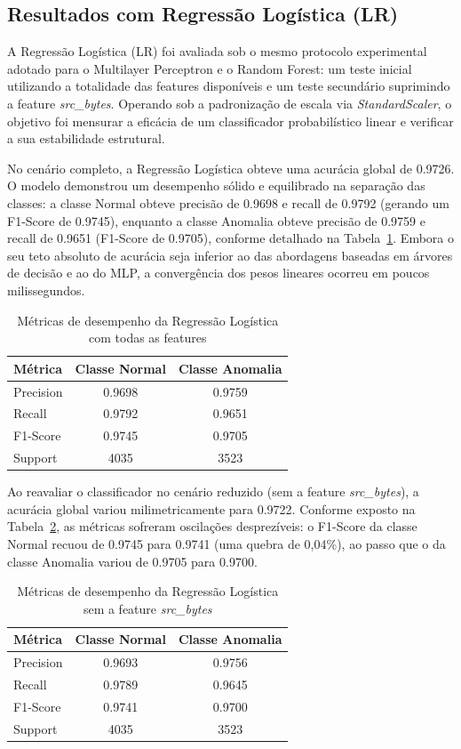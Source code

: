 \subsection{Resultados com Regressão Logística (LR)}

A Regressão Logística (LR) foi avaliada sob o mesmo protocolo experimental adotado para o Multilayer Perceptron e o Random Forest: um teste inicial utilizando a totalidade das features disponíveis e um teste secundário suprimindo a feature \textit{src\_bytes}. Operando sob a padronização de escala via \textit{StandardScaler}, o objetivo foi mensurar a eficácia de um classificador probabilístico linear e verificar a sua estabilidade estrutural.

No cenário completo, a Regressão Logística obteve uma acurácia global de 0.9726. O modelo demonstrou um desempenho sólido e equilibrado na separação das classes: a classe Normal obteve precisão de 0.9698 e recall de 0.9792 (gerando um F1-Score de 0.9745), enquanto a classe Anomalia obteve precisão de 0.9759 e recall de 0.9651 (F1-Score de 0.9705), conforme detalhado na Tabela~\ref{tab:lr_full}. Embora o seu teto absoluto de acurácia seja inferior ao das abordagens baseadas em árvores de decisão e ao do MLP, a convergência dos pesos lineares ocorreu em poucos milissegundos.

\begin{table}[ht]
\centering
\caption{Métricas de desempenho da Regressão Logística com todas as features}
\label{tab:lr_full}
\begin{tabular}{lcc}
\hline
\textbf{Métrica} & \textbf{Classe Normal} & \textbf{Classe Anomalia} \\
\hline
Precision & 0.9698 & 0.9759 \\
Recall    & 0.9792 & 0.9651 \\
F1-Score  & 0.9745 & 0.9705 \\
Support   & 4035   & 3523   \\
\hline
\end{tabular}
\end{table}

Ao reavaliar o classificador no cenário reduzido (sem a feature \textit{src\_bytes}), a acurácia global variou milimetricamente para 0.9722. Conforme exposto na Tabela~\ref{tab:lr_reduced}, as métricas sofreram oscilações desprezíveis: o F1-Score da classe Normal recuou de 0.9745 para 0.9741 (uma quebra de 0,04\%), ao passo que o da classe Anomalia variou de 0.9705 para 0.9700.

\begin{table}[ht]
\centering
\caption{Métricas de desempenho da Regressão Logística sem a feature \textit{src\_bytes}}
\label{tab:lr_reduced}
\begin{tabular}{lcc}
\hline
\textbf{Métrica} & \textbf{Classe Normal} & \textbf{Classe Anomalia} \\
\hline
Precision & 0.9693 & 0.9756 \\
Recall    & 0.9789 & 0.9645 \\
F1-Score  & 0.9741 & 0.9700 \\
Support   & 4035   & 3523   \\
\hline
\end{tabular}
\end{table}

